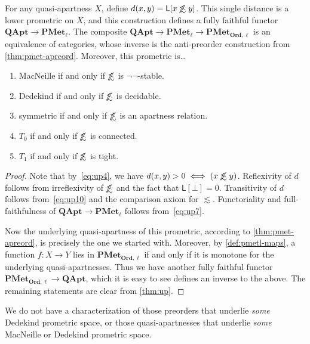 \documentclass{article}
\def\L[#1]{\mathsf{L}[#1]}
\def\oapt{\mathrel{\!\not\,\not\lesssim}}
\def\leapx{\lesssim}
\def\nn{\ensuremath{\neg\neg}}
\def\Set{\mathbf{Set}}
\def\PMetl{\mathbf{PMet}_\ell}
\def\PMetOrdl{\mathbf{PMet}_{\mathbf{Ord},\ell}}
\def\QApt{\mathbf{QApt}}
\begin{document}
\begin{thm}\label{thm:qapt-pmetl}
  For any quasi-apartness $X$, define $d(x,y) = \L[x\oapt y]$.
  This single distance is a lower prometric on $X$, and this construction defines a fully faithful functor $\QApt \to \PMetl$.
  The composite $\QApt \to \PMetl \to \PMetOrdl$ is an equivalence of categories, whose inverse is the anti-preorder construction from \cref{thm:pmet-apreord}.
  Moreover, this prometric is\dots
  \begin{enumerate}
  \item MacNeille if and only if $\oapt$ is \nn-stable.
  \item Dedekind if and only if $\oapt$ is decidable.
  \item symmetric if and only if $\oapt$ is an apartness relation.
  \item $T_0$ if and only if $\oapt$ is connected.
  \item $T_1$ if and only if $\oapt$ is tight.
  \end{enumerate}
\end{thm}
\begin{proof}
  Note that by~\eqref{eq:up4}, we have $d(x,y)>0 \iff (x\oapt y)$.
  Reflexivity of $d$ follows from irreflexivity of $\oapt$ and the fact that $\L[\bot]=0$.
  Transitivity of $d$ follows from~\eqref{eq:up10} and the comparison axiom for $\leapx$.
  Functoriality and full-faithfulness of $\QApt \to \PMetl$ follows from~\eqref{eq:up7}.
  
  Now the underlying quasi-apartness of this prometric, according to \cref{thm:pmet-apreord}, is precisely the one we started with.
  Moreover, by \cref{def:pmetl-maps}, a function $f:X\to Y$ lies in $\PMetOrdl$ if and only if it is monotone for the underlying quasi-apartnesses.
  Thus we have another fully faithful functor $\PMetOrdl \to \QApt$, which it is easy to see defines an inverse to the above.
  The remaining statements are clear from \cref{thm:up}.
\end{proof}

We do not have a characterization of those preorders that underlie \emph{some} Dedekind prometric space, or those quasi-apartnesses that underlie \emph{some} MacNeille or Dedekind prometric space.

\end{document}
